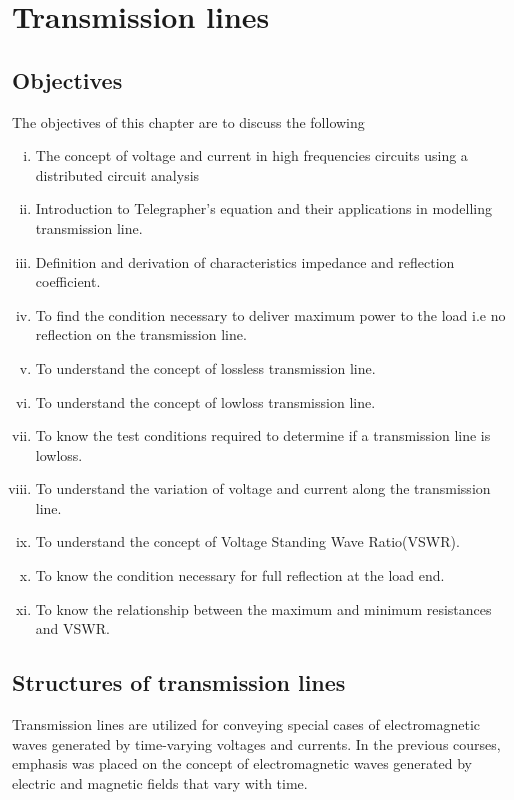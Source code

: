 \chapter{Transmission lines}\label{lec:lec2}

\begin{mdframed}[backgroundcolor=lightblue, linewidth=1pt, hidealllines=true]
\section{Objectives}
The objectives of this chapter are to discuss the following
\begin{enumerate}[(i)]
    \item The concept of voltage and current in high frequencies circuits using a distributed circuit analysis
    \item Introduction to Telegrapher's equation and their applications in modelling transmission line.
    \item Definition and derivation of characteristics impedance and reflection coefficient.
    \item To find the condition necessary to deliver maximum power to the load i.e no reflection on the transmission line.
    \item To understand the concept of lossless transmission line.
    \item To understand the concept of lowloss transmission line.
    \item To know the test conditions required to determine if a transmission line is lowloss.
    \item To understand the variation of voltage and current along the transmission line.
    \item To understand the concept of Voltage Standing Wave Ratio(VSWR).
    \item To know the condition necessary for full reflection at the load end.
    \item To know the relationship between the maximum and minimum resistances and VSWR. 
\end{enumerate}
\end{mdframed}

\section{Structures of transmission lines}

Transmission lines are utilized for conveying special cases of electromagnetic waves generated by time-varying voltages and currents. In the previous courses, emphasis was placed on the concept of electromagnetic waves generated by electric and magnetic fields that vary with time.

